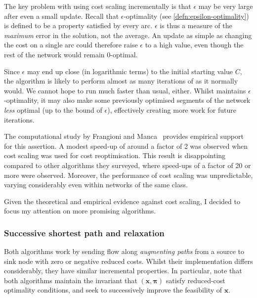 The key problem with using cost scaling incrementally is that $\epsilon$ may be very large after even a small update. Recall that $\epsilon$-optimality (see \cref{defn:epsilon-optimality}) is defined to be a property satisfied by every arc. $\epsilon$ is thus a measure of the \emph{maximum} error in the solution, not the average. An update as simple as changing the cost on a single arc could therefore raise $\epsilon$ to a high value, even though the rest of the network would remain $0$-optimal\footnotemark.

Since $\epsilon$ may end up close (in logarithmic terms) to the initial starting value $C$, the algorithm is likely to perform almost as many iterations of  as it normally would. We cannot hope  to run much faster than usual, either. Whilst  maintains $\epsilon$-optimality, it may also make some previously optimised segments of the network \emph{less} optimal (up to the bound of $\epsilon$), effectively creating more work for future iterations.

The computational study by Frangioni and Manca~\cite{Frangioni:2006} provides empirical support for this assertion. A modest speed-up of around a factor of 2 was observed when cost scaling was used for cost reoptimisation. This result is disappointing compared to other algorithms they surveyed, where speed-ups of a factor of 20 or more were observed. Moreover, the performance of cost scaling was unpredictable, varying considerably even within networks of the same class.

Given the theoretical and empirical evidence against cost scaling, I decided to focus my attention on more promising algorithms.

\subsubsection{Successive shortest path and relaxation}

Both algorithms work by sending flow along \emph{augmenting paths} from a source to sink node with zero or negative reduced costs. Whilst their implementation differs considerably, they have similar incremental properties. In particular, note that both algorithms maintain the invariant that $\left(\mathbf{x},\boldsymbol{\pi}\right)$ satisfy reduced-cost optimality conditions, and seek to successively improve the feasibility of $\mathbf{x}$\footnotemark.

